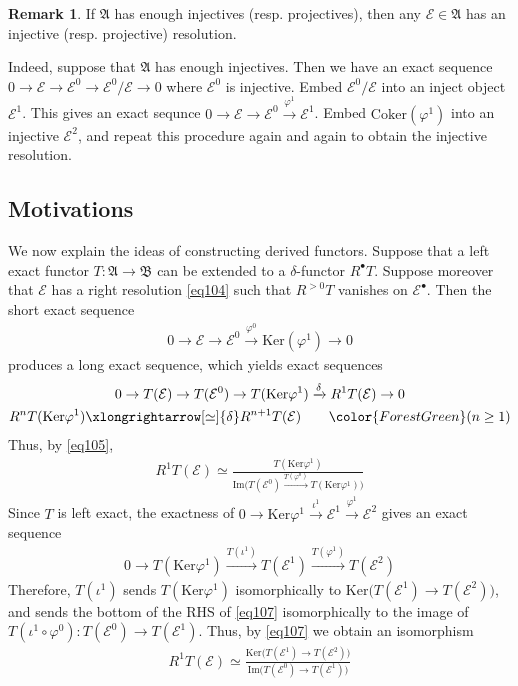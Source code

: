 \documentclass[12pt,b5paper,notitlepage]{report}
\theoremstyle{definition}
\newtheorem{rem}[df]{Remark}
\theoremstyle{plain}
\newcommand{\fk}{\mathfrak}
\newcommand{\mc}{\mathcal}
\newcommand{\blt}{\bullet}
\newcommand{\Ker}{\mathrm{Ker}}
\newcommand{\Cok}{\mathrm{Coker}}
\newcommand{\Imag}{\mathrm{Im}}
\numberwithin{equation}{section}
\begin{document}
\begin{rem}
If $\fk A$ has enough injectives (resp. projectives), then any $\mc E\in\fk A$ has an injective (resp. projective) resolution.

Indeed, suppose that $\fk A$ has enough injectives. Then we have an exact sequence $0\rightarrow\mc E\rightarrow\mc E^0\rightarrow\mc E^0/\mc E\rightarrow0$ where $\mc E^0$ is injective. Embed $\mc E^0/\mc E$ into an inject object $\mc E^1$. This gives an exact sequnce $0\rightarrow\mc E\rightarrow\mc E^0\xrightarrow{\varphi^1}\mc E^1$. Embed $\Cok(\varphi^1)$ into an injective $\mc E^2$, and repeat this procedure again and again to obtain the injective resolution. \hfill\qedsymbol
\end{rem}

\subsection{Motivations}\label{lb310}


We now explain the ideas  of constructing derived functors. Suppose that a left exact functor $T:\fk A\rightarrow\fk B$ can be extended to a $\delta$-functor $R^\blt T$. Suppose moreover that  $\mc E$ has a right resolution \eqref{eq104} such that $R^{>0}T$ vanishes on $\mc E^\blt$. Then the short exact sequence
\begin{align*}
0\rightarrow\mc E\rightarrow\mc E^0\xrightarrow{\varphi^0}\Ker(\varphi^1)\rightarrow0
\end{align*}
produces a long exact sequence, which yields exact sequences
\begin{subequations}
\begin{gather}
0\rightarrow T(\mc E)\rightarrow T(\mc E^0)\rightarrow T(\Ker\varphi^1)\xrightarrow{\delta} R^1T(\mc E)\rightarrow0  \label{eq105}\\
R^nT(\Ker\varphi^1)\xlongrightarrow[\simeq]{\delta}R^{n+1}T(\mc E)\qquad {\color{ForestGreen}(n\geq 1)}  \label{eq106}
\end{gather}
\end{subequations}
Thus, by \eqref{eq105},
\begin{align}
R^1T(\mc E)\simeq\frac{T(\Ker\varphi^1)}{\Imag\big(T(\mc E^0)\xrightarrow{T(\varphi^0)} T(\Ker\varphi^1) \big)}\label{eq107}
\end{align}
Since $T$ is left exact, the exactness of $0\rightarrow\Ker\varphi^1\xrightarrow{\iota^1}\mc E^1\xrightarrow{\varphi^1}\mc E^2$ gives an exact sequence
\begin{align*}
0\rightarrow T(\Ker\varphi^1)\xrightarrow{T(\iota^1)}T(\mc E^1)\xrightarrow{T(\varphi^1)} T(\mc E^2)
\end{align*}
Therefore, $T(\iota^1)$ sends $T(\Ker\varphi^1)$ isomorphically to $\Ker\big(T(\mc E^1)\rightarrow T(\mc E^2)\big)$, and sends the bottom of the RHS of \eqref{eq107} isomorphically to the image of $T(\iota^1\circ\varphi^0):T(\mc E^0)\rightarrow T(\mc E^1)$. Thus, by \eqref{eq107} we obtain an isomorphism
\begin{align}
R^1T(\mc E)\simeq \frac{\Ker\big(T(\mc E^1)\rightarrow T(\mc E^2)\big)}{\Imag\big(T(\mc E^0)\rightarrow T(\mc E^1)\big)}  \label{eq108}
\end{align}
\end{document}

